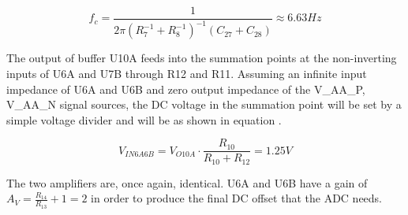 \begin{equation}\label{eq:7_1_3_SimplePole}
    f_{c} = \frac{1}{2\pi (R_7^{-1} + R_8^{-1})^{-1}(C_{27}+C_{28})} \approx 6.63 Hz 
\end{equation}

The output of buffer U10A feeds into the summation points at the non-inverting inputs of U6A and U7B through R12 and R11. Assuming an infinite input impedance of U6A and U6B and zero output impedance of the V\_AA\_P, V\_AA\_N signal sources, the DC voltage in the summation point will be set by a simple voltage divider and will be  as shown in equation .

\begin{equation}\label{eq:7_1_3_InputVolt}
    V_{IN6A6B} = V_{O10A} \cdot \frac{R_{10}}{R_{10}+R_{12}} = 1.25V
\end{equation}

The two amplifiers are, once again, identical. U6A and U6B have a gain of $A_V = \frac{R_{14}}{R_{13}} + 1 =  2$ in order to produce the final  DC offset that the ADC needs. 

